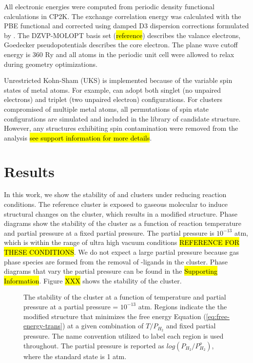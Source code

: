 \documentclass[journal=jctcce,manuscript=article]{achemso}
\begin{document}
All electronic energies were computed from periodic density functional calculations in CP2K.\cite{Hutter2014} The exchange correlation energy was calculated with the PBE functional\cite{Perdew1996} and corrected using damped D3 dispersion corrections formulated by \citeauthor{Grimme2010}.\cite{Grimme2010} The DZVP-MOLOPT basis set (\hl{reference}) describes the valance electrons, Goedecker pseudopotentials\cite{Goedecker1996} describes the core electron. The plane wave cutoff energy is 360 Ry and  all atoms in the periodic unit cell were allowed to relax during geometry optimizations.

Unrestricted Kohn-Sham (UKS) is implemented because of the variable spin states of metal atoms. For example,  can adopt both singlet (no unpaired electrons) and triplet (two unpaired electron) configurations. For clusters compromised of multiple metal atoms, all permutations of spin state configurations are simulated and included in the library of candidate structure. However, any structures exhibiting spin contamination were removed from the analysis \hl{see support information for more details}.   


\newpage
\section{Results}
In this work, we show the stability of  and  clusters under reducing reaction conditions. The reference cluster is exposed to gaseous molecular  to induce structural changes on the cluster, which results in a modified structure. Phase diagrams show the stability of the cluster as a function of reaction temperature and  partial pressure at a fixed  partial pressure. The  partial pressure is $10^{-13}$ atm, which is within the range of ultra high vacuum conditions \hl{REFERENCE FOR THESE CONDITIONS}. We do not expect a large  partial pressure because gas phase  species are formed from the removal of -ligands in the cluster. Phase diagrams that vary the  partial pressure can be found in the \hl{Supporting Information}. Figure \hl{XXX} shows the stability of the  cluster. 

\begin{figure}
    \centering
    \caption{The stability of the  cluster at a function of temperature and  partial pressure at a  partial pressure = $10^{-13}$ atm. Regions indicate the the modified structure that minimizes the free energy Equation (\ref{eq:free-energy-trans}) at a given combination of $T/P_{H_{2}}$ and fixed  partial pressure. The name convention utilized to label each region is used throughout. The  partial pressure is reported as $log(P_{H_{2}}/P_{H_{2}}^{o})$, where the standard state is 1 atm.}
    \label{fig:phase_diagram_TandP}
\end{figure}
\end{document}
